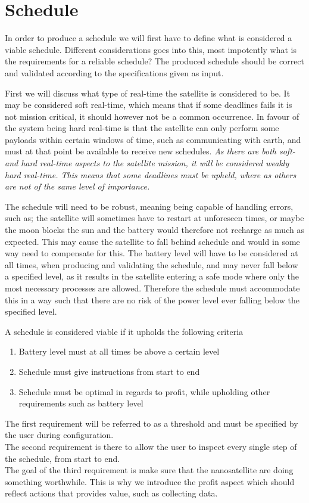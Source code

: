 \section{Schedule} \label{sec:schedule}
In order to produce a schedule we will first have to define what is considered a viable schedule. Different considerations goes into this, most impotently what is the requirements for a reliable schedule? The produced schedule should be correct and validated according to the specifications given as input.

First we will discuss what type of real-time the satellite is considered to be. It may be considered soft real-time, which means that if some deadlines fails it is not mission critical, it should however not be a common occurrence. In favour of the system being hard real-time is that the satellite can only perform some payloads within certain windows of time, such as communicating with earth, and must at that point be available to receive new schedules. \textit{As there are both soft- and hard real-time aspects to the satellite mission, it will be considered weakly hard real-time. This means that some deadlines must be upheld, where as others are not of the same level of importance.}

The schedule will need to be robust, meaning being capable of handling errors, such as; the satellite will sometimes have to restart at unforeseen times, or maybe the moon blocks the sun and the battery would therefore not recharge as much as expected. This may cause the satellite to fall behind schedule and would in some way need to compensate for this.
The battery level will have to be considered at all times, when producing and validating the schedule, and may never fall below a specified level, as it results in the satellite entering a safe mode where only the most necessary processes are allowed.
Therefore the schedule must accommodate this in a way such that there are no risk of the power level ever falling below the specified level.

A schedule is considered viable if it upholds the following criteria
\begin{enumerate}
	\item Battery level must at all times be above a certain level
	\item Schedule must give instructions from start to end
	\item Schedule must be optimal in regards to profit, while upholding other requirements such as battery level
\end{enumerate}
The first requirement will be referred to as a threshold and must be specified by the user during configuration.\\
The second requirement is there to allow the user to inspect every single step of the schedule, from start to end.\\ 
The goal of the third requirement is make sure that the nanosatellite are doing something worthwhile. This is why we introduce the profit aspect which should reflect actions that provides value, such as collecting data.

